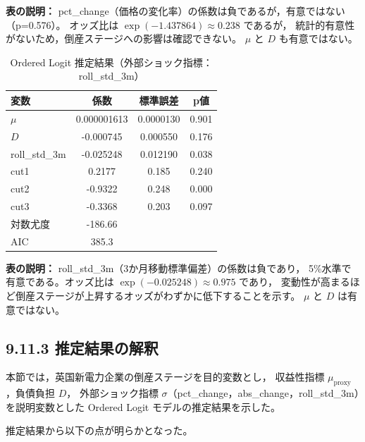 \noindent
{\small
\textbf{表の説明：}  
pct\_change（価格の変化率）の係数は負であるが，有意ではない（p=0.576）。
オッズ比は $\exp(-1.437864)\approx 0.238$ であるが，
統計的有意性がないため，倒産ステージへの影響は確認できない。
$\mu$ と $D$ も有意ではない。
}

\vspace{1em}


\begin{table}[H]
\centering
\caption{Ordered Logit 推定結果（外部ショック指標：roll\_std\_3m）}
\begin{tabular}{lccc}
\hline
変数 & 係数 & 標準誤差 & p値 \\
\hline
$\mu$ & 0.000001613 & 0.0000130 & 0.901 \\
$D$ & -0.000745 & 0.000550 & 0.176 \\
roll\_std\_3m & -0.025248 & 0.012190 & 0.038 \\
\hline
cut1 & 0.2177 & 0.185 & 0.240 \\
cut2 & -0.9322 & 0.248 & 0.000 \\
cut3 & -0.3368 & 0.203 & 0.097 \\
\hline
対数尤度 & -186.66 & & \\
AIC & 385.3 & & \\
\hline
\end{tabular}
\end{table}

\noindent
{\small
\textbf{表の説明：}  
roll\_std\_3m（3か月移動標準偏差）の係数は負であり，
5\%水準で有意である。オッズ比は $\exp(-0.025248)\approx 0.975$ であり，
変動性が高まるほど倒産ステージが上昇するオッズがわずかに低下することを示す。
$\mu$ と $D$ は有意ではない。
}


\subsection*{9.11.3 推定結果の解釈}

本節では，英国新電力企業の倒産ステージを目的変数とし，
収益性指標 $\mu_{\text{proxy}}$，負債負担 $D$，
外部ショック指標 $\sigma$（pct\_change，abs\_change，roll\_std\_3m）を説明変数とした
Ordered Logit モデルの推定結果を示した。

推定結果から以下の点が明らかとなった。

